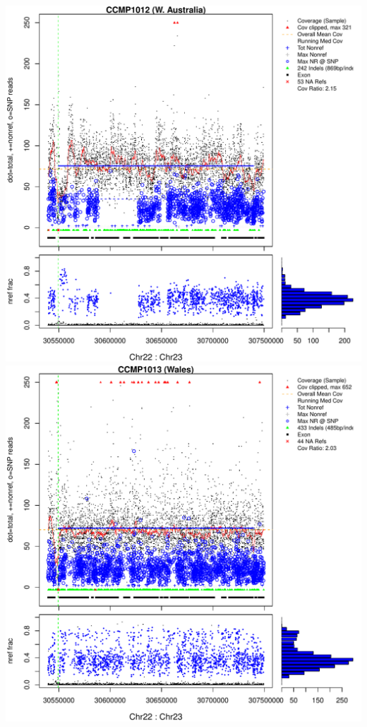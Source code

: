\documentclass{article}\usepackage[]{graphicx}\usepackage[]{color}
\makeatletter
\def\maxwidth{ %
  \ifdim\Gin@nat@width>\linewidth
    \linewidth
  \else
    \Gin@nat@width
  \fi
}
\newenvironment{knitrout}{}{} %
\makeatother
\begin{document}
\begin{knitrout}
{\includegraphics[width=\maxwidth]{figs-knitr/unnamed-chunk-41-3} 
\includegraphics[width=\maxwidth]{figs-knitr/unnamed-chunk-41-4} 
}
\end{knitrout}
\end{document}
